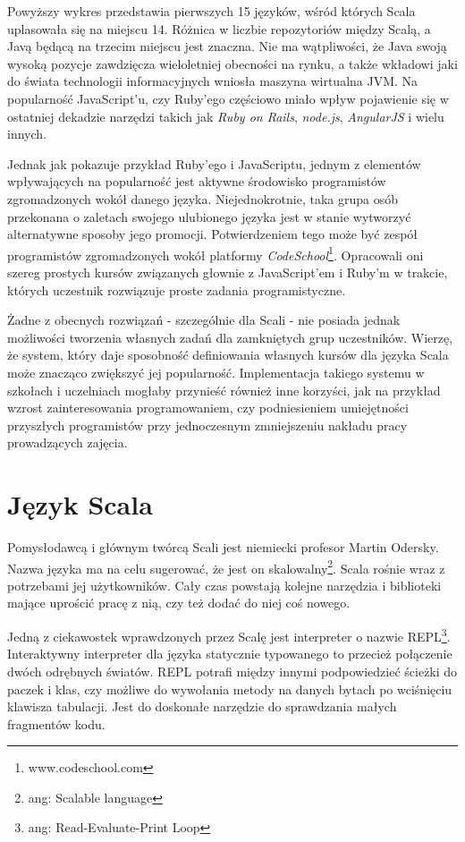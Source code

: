 \documentclass[brudnopis]{xmgr}
\begin{document}
Powyższy wykres przedstawia pierwszych 15 języków, wśród których Scala uplasowała się na miejscu 14. Różnica w liczbie repozytoriów między Scalą, a Javą będącą na trzecim miejscu jest znaczna. Nie ma wątpliwości, że Java swoją wysoką pozycje zawdzięcza wieloletniej obecności na rynku, a także wkładowi jaki do świata technologii informacyjnych wniosła maszyna wirtualna JVM. Na popularność JavaScript'u, czy Ruby'ego częściowo miało wpływ pojawienie się w ostatniej dekadzie narzędzi takich jak \textit{Ruby on Rails}, \textit{node.js}, \textit{AngularJS} i wielu innych. 

Jednak jak pokazuje przykład Ruby'ego i JavaScriptu, jednym z elementów wpływających na popularność jest aktywne środowisko programistów zgromadzonych wokół danego języka. Niejednokrotnie, taka grupa osób przekonana o zaletach swojego ulubionego języka jest w stanie wytworzyć alternatywne sposoby jego promocji. Potwierdzeniem tego może być zespół programistów zgromadzonych wokół platformy \textit{CodeSchool}\footnote{www.codeschool.com}. Opracowali oni szereg prostych kursów związanych głownie z JavaScript'em i Ruby'm w trakcie, których uczestnik rozwiązuje proste zadania programistyczne. 

Żadne z obecnych rozwiązań - szczególnie dla Scali - nie posiada jednak możliwości tworzenia własnych zadań dla zamkniętych grup uczestników. Wierzę, że system, który daje sposobność definiowania własnych kursów dla języka Scala może znacząco zwiększyć jej popularność. Implementacja takiego systemu w szkołach i uczelniach mogłaby przynieść również inne korzyści, jak na przykład wzrost zainteresowania programowaniem, czy podniesieniem umiejętności przyszłych programistów przy jednoczesnym zmniejszeniu nakładu pracy prowadzących zajęcia.

\section{Język Scala}

Pomysłodawcą i głównym twórcą Scali jest niemiecki profesor Martin Odersky. Nazwa języka ma na celu sugerować, że jest on skalowalny\footnote{ang: Scalable language}. Scala rośnie wraz z potrzebami jej użytkowników. Cały czas powstają kolejne narzędzia i biblioteki mające uprościć pracę z nią, czy też dodać do niej coś nowego. 

Jedną z ciekawostek wprawdzonych przez Scalę jest interpreter o nazwie REPL\footnote{ang: Read-Evaluate-Print Loop}. Interaktywny interpreter dla języka statycznie typowanego to przecież połączenie dwóch odrębnych światów. REPL potrafi między innymi podpowiedzieć ścieżki do paczek i klas, czy możliwe do wywołania metody na danych bytach po wciśnięciu klawisza tabulacji. Jest do doskonałe narzędzie do sprawdzania małych fragmentów kodu.
\end{document}
